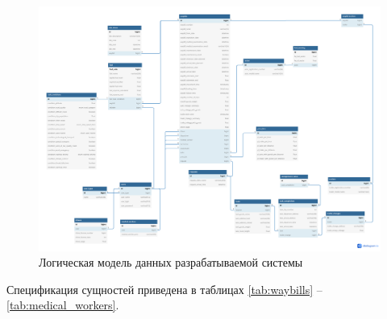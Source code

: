 \documentclass[../nirs.tex]{subfiles}
\begin{document}
\begin{figure}[H]
	\centering
	\includegraphics[keepaspectratio,width=\textwidth]{./images/3_1_db_physical.png}
	\caption{Логическая модель данных разрабатываемой системы}
	\label{fig:3_1_db_logical}
\end{figure}

Спецификация сущностей приведена в таблицах \ref{tab:waybills} --
\ref{tab:medical_workers}.


















\end{document}
